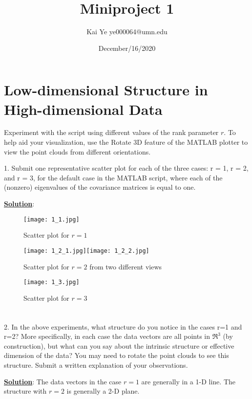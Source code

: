 \documentclass[12pt, letterpaper]{article}
\title{Miniproject 1}
\author{Kai Ye  \space\space\space ye000064@umn.edu}
\date{December/16/2020}
\begin{document}
\maketitle

\section{Low-dimensional Structure in High-dimensional Data}
Experiment with the script using different values of the rank parameter $r$. To help aid your visualization, use the Rotate 3D feature of the MATLAB plotter to view the point clouds from different orientations.

1. Submit one representative scatter plot for each of the three cases: r = 1, r = 2, and r = 3, for the default case in the MATLAB script, where each of the (nonzero) eigenvalues of the covariance matrices is equal to one.

\noindent
\textbf{\underline{Solution}}: 
\begin{figure}[h]
  \centering
  \texttt{[image: 1\_1.jpg]}
  \caption{Scatter plot for $r=1$}
  \label{fig:1_1}
\end{figure}

\begin{figure}[h]
  \centering
  \texttt{[image: 1\_2\_1.jpg]}\texttt{[image: 1\_2\_2.jpg]}
  \caption{Scatter plot for $r=2$ from two different views}
  \label{fig:1_2}
\end{figure}

\begin{figure}[h]
  \centering
  \texttt{[image: 1\_3.jpg]}
  \caption{Scatter plot for $r=3$}
  \label{fig:1_3}
\end{figure}

\section*{}

2. In the above experiments, what structure do you notice in the cases r=1 and r=2? More specifically, in each case the data vectors are all points in $\Re^3$ (by construction), but what can you say about the intrinsic structure or effective dimension of the data? You may need to rotate the point clouds to see this structure. Submit a written explanation of your observations.

\noindent
\textbf{\underline{Solution}}: The data vectors in the case $r=1$ are generally in a 1-D line. The structure with $r=2$ is generally a 2-D plane.
\end{document}
